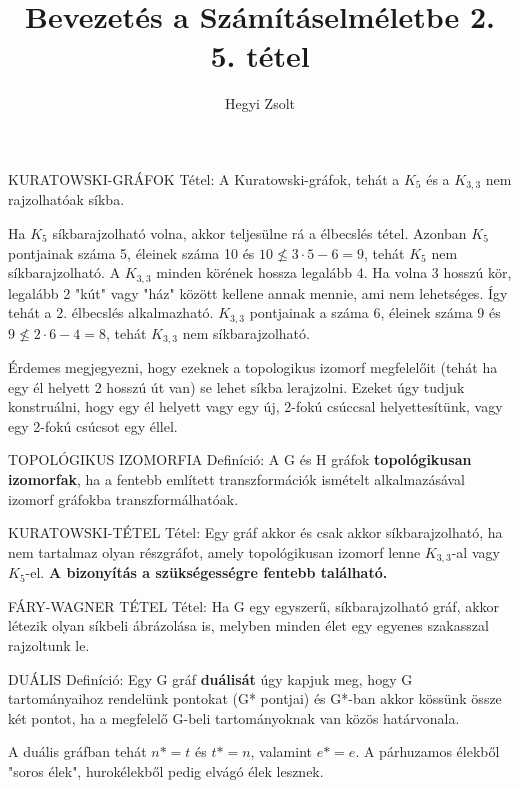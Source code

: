\documentclass[]{article}
\title{Bevezetés a Számításelméletbe 2.\\{\large 5. tétel}}
\author{Hegyi Zsolt}
\begin{document}
\maketitle
\begin{framed}
KURATOWSKI-GRÁFOK Tétel: A Kuratowski-gráfok, tehát a $K_5$ és a $K_{3,3}$ nem rajzolhatóak síkba.
\end{framed}
\begin{leftbar}
Ha $K_5$ síkbarajzolható volna, akkor teljesülne rá a élbecslés tétel. Azonban $K_5$ pontjainak száma 5, éleinek száma 10 és $10 \not\leq 3 \cdot 5 -6 = 9$, tehát $K_5$ nem síkbarajzolható.
A $K_{3,3}$ minden körének hossza legalább 4. Ha volna 3 hosszú kör, legalább 2 "kút" vagy "ház" között kellene annak mennie, ami nem lehetséges. Így tehát a 2. élbecslés alkalmazható. $K_{3,3}$ pontjainak a száma 6, éleinek száma 9 és $9 \not\leq 2 \cdot 6 - 4 = 8$, tehát $K_{3,3}$ nem síkbarajzolható.
\end{leftbar}
Érdemes megjegyezni, hogy ezeknek a topologikus izomorf megfelelőit (tehát ha egy él helyett 2 hosszú út van) se lehet síkba lerajzolni. Ezeket úgy tudjuk konstruálni, hogy egy él helyett vagy egy új, 2-fokú csúccsal helyettesítünk, vagy egy 2-fokú csúcsot egy éllel.
\begin{shaded}
TOPOLÓGIKUS IZOMORFIA Definíció: A G és H gráfok \textbf{topológikusan izomorfak}, ha a fentebb említett transzformációk ismételt alkalmazásával izomorf gráfokba transzformálhatóak.
\end{shaded}
\begin{framed}
KURATOWSKI-TÉTEL Tétel: Egy gráf akkor és csak akkor síkbarajzolható, ha nem tartalmaz olyan részgráfot, amely topológikusan izomorf lenne $K_{3,3}$-al vagy $K_5$-el. \textbf{A bizonyítás a szükségességre fentebb található.}
\end{framed}
\begin{framed}
FÁRY-WAGNER TÉTEL Tétel: Ha G egy egyszerű, síkbarajzolható gráf, akkor létezik olyan síkbeli ábrázolása is, melyben minden élet egy egyenes szakasszal rajzoltunk le.
\end{framed}
\begin{shaded}
DUÁLIS Definíció: Egy G gráf \textbf{duálisát} úgy kapjuk meg, hogy G tartományaihoz rendelünk pontokat (G* pontjai) és G*-ban akkor kössünk össze két pontot, ha a megfelelő G-beli tartományoknak van közös határvonala.
\end{shaded}
A duális gráfban tehát $n* = t$ és $t* = n$, valamint $e* = e$.
A párhuzamos élekből "soros élek", hurokélekből pedig elvágó élek lesznek.
\end{document}
